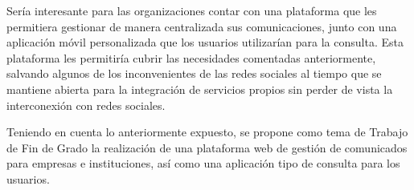 Sería interesante para las organizaciones contar con una plataforma que les permitiera gestionar de manera centralizada sus comunicaciones, junto con una aplicación móvil personalizada que los usuarios utilizarían para la consulta. Esta plataforma les permitiría cubrir las necesidades comentadas anteriormente, salvando algunos de los inconvenientes de las redes sociales al tiempo que se mantiene abierta para la integración de servicios propios sin perder de vista la interconexión con redes sociales.

Teniendo en cuenta lo anteriormente expuesto, se propone como tema de Trabajo de Fin de Grado la realización de una plataforma web de gestión de comunicados para empresas e instituciones, así como una aplicación tipo de consulta para los usuarios.